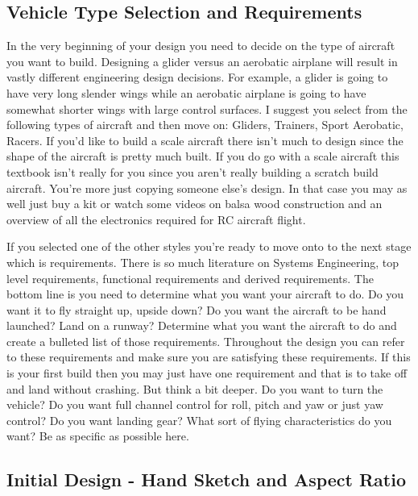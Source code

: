\documentclass{article}
\begin{document}
\subsection{Vehicle Type Selection and Requirements}

In the very beginning of your design you need to decide on the type of
aircraft you want to build. Designing a glider versus an aerobatic
airplane will result in vastly different engineering design
decisions. For example, a glider is going to have very long slender
wings while an aerobatic airplane is going to have somewhat shorter
wings with large control surfaces. I suggest you select from the
following types of aircraft and then move on: Gliders, Trainers, Sport
Aerobatic, Racers. If you'd like to build a scale aircraft there isn't
much to design since the shape of the aircraft is pretty much
built. If you do go with a scale aircraft this textbook isn't really
for you since you aren't really building a scratch build
aircraft. You're more just copying someone else's design. In that case
you may as well just buy a kit or watch some videos on balsa wood
construction and an overview of all the electronics required for RC
aircraft flight.

If you selected one of the other styles you're ready to move onto to
the next stage which is requirements. There is so much literature on
Systems Engineering, top level requirements, functional
requirements and derived requirements. The bottom line is you need to
determine what you want your aircraft to do. Do you want it to fly
straight up, upside down? Do you want the aircraft to be hand
launched? Land on a runway? Determine what you want the aircraft to do
and create a bulleted list of those requirements. Throughout the
design you can refer to these requirements and make sure you are
satisfying these requirements. If this is your first build then you
may just have one requirement and that is to take off and land without
crashing. But think a bit deeper. Do you want to turn the vehicle? Do
you want full channel control for roll, pitch and yaw or just yaw
control? Do you want landing gear? What sort of flying characteristics
do you want? Be as specific as possible here. 

\subsection{Initial Design - Hand Sketch and Aspect Ratio}
\end{document}
